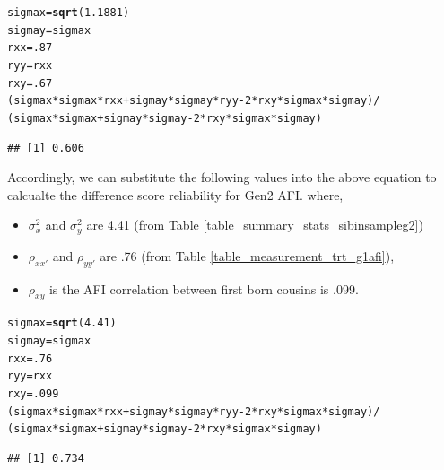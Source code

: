 \documentclass[a4paper,man,apacite,natbib,12pt]{apa6}\usepackage[]{graphicx}\usepackage[]{color}
\makeatletter
\newcommand{\hlnum}[1]{\textcolor[rgb]{0.686,0.059,0.569}{#1}}%
\newcommand{\hlopt}[1]{\textcolor[rgb]{0,0,0}{#1}}%
\newcommand{\hlstd}[1]{\textcolor[rgb]{0.345,0.345,0.345}{#1}}%
\newcommand{\hlkwb}[1]{\textcolor[rgb]{0.69,0.353,0.396}{#1}}%
\newcommand{\hlkwd}[1]{\textcolor[rgb]{0.737,0.353,0.396}{\textbf{#1}}}%
\newenvironment{kframe}{%
 \def\at@end@of@kframe{}%
 \ifinner\ifhmode%
  \def\at@end@of@kframe{\end{minipage}}%
  \begin{minipage}{\columnwidth}%
 \fi\fi%
 \def\FrameCommand##1{\hskip\@totalleftmargin \hskip-\fboxsep
 \colorbox{shadecolor}{##1}\hskip-\fboxsep
     \hskip-\linewidth \hskip-\@totalleftmargin \hskip\columnwidth}%
 \MakeFramed {\advance\hsize-\width
   \@totalleftmargin\z@ \linewidth\hsize
   \@setminipage}}%
 {\par\unskip\endMakeFramed%
 \at@end@of@kframe}
\newenvironment{knitrout}{}{} %
\newlength{\wideitemsep}
\let\olditem\item
\renewcommand{\item}{\setlength{\itemsep}{\wideitemsep}\olditem}
\makeatother
\begin{document}

\begin{knitrout}\footnotesize
{}\color{fgcolor}\begin{kframe}
\begin{alltt}
\hlstd{sigmax} \hlkwb{=} \hlkwd{sqrt}\hlstd{(}\hlnum{1.1881}\hlstd{)}
\hlstd{sigmay} \hlkwb{=} \hlstd{sigmax}
\hlstd{rxx} \hlkwb{=} \hlnum{.87}
\hlstd{ryy} \hlkwb{=} \hlstd{rxx}
\hlstd{rxy}\hlkwb{=}\hlnum{.67}
\hlstd{(sigmax}\hlopt{*}\hlstd{sigmax}\hlopt{*}\hlstd{rxx} \hlopt{+}\hlstd{sigmay}\hlopt{*}\hlstd{sigmay}\hlopt{*}\hlstd{ryy} \hlopt{-}\hlnum{2}\hlopt{*}\hlstd{rxy}\hlopt{*}\hlstd{sigmax}\hlopt{*}\hlstd{sigmay)} \hlopt{/}
  \hlstd{(sigmax}\hlopt{*}\hlstd{sigmax} \hlopt{+} \hlstd{sigmay}\hlopt{*}\hlstd{sigmay} \hlopt{-}\hlnum{2}\hlopt{*}\hlstd{rxy}\hlopt{*}\hlstd{sigmax}\hlopt{*}\hlstd{sigmay)}
\end{alltt}
\begin{verbatim}
## [1] 0.606
\end{verbatim}
\end{kframe}
\end{knitrout}
Accordingly, we can substitute the following values into the above equation to calcualte the difference score reliability for Gen2 AFI.
where, \begin{itemize}
\item $\sigma_{x}^{2}$ and $\sigma_{y}^{2}$  are 4.41 (from Table \vref{table_summary_stats_sibinsampleg2}) %
\item $\rho_{xx'}$ and $\rho_{yy'}$ are .76 (from Table \vref{table_measurement_trt_g1afi}), 
\item $\rho_{xy}$ is the AFI correlation between first born cousins is .099.\end{itemize}
\begin{knitrout}\footnotesize
{}\color{fgcolor}\begin{kframe}
\begin{alltt}
\hlstd{sigmax} \hlkwb{=} \hlkwd{sqrt}\hlstd{(}\hlnum{4.41}\hlstd{)}
\hlstd{sigmay} \hlkwb{=} \hlstd{sigmax}
\hlstd{rxx} \hlkwb{=} \hlnum{.76}
\hlstd{ryy} \hlkwb{=} \hlstd{rxx}
\hlstd{rxy}\hlkwb{=}\hlnum{.099}
\hlstd{(sigmax}\hlopt{*}\hlstd{sigmax}\hlopt{*}\hlstd{rxx} \hlopt{+}\hlstd{sigmay}\hlopt{*}\hlstd{sigmay}\hlopt{*}\hlstd{ryy} \hlopt{-}\hlnum{2}\hlopt{*}\hlstd{rxy}\hlopt{*}\hlstd{sigmax}\hlopt{*}\hlstd{sigmay)} \hlopt{/}
  \hlstd{(sigmax}\hlopt{*}\hlstd{sigmax} \hlopt{+} \hlstd{sigmay}\hlopt{*}\hlstd{sigmay} \hlopt{-}\hlnum{2}\hlopt{*}\hlstd{rxy}\hlopt{*}\hlstd{sigmax}\hlopt{*}\hlstd{sigmay)}
\end{alltt}
\begin{verbatim}
## [1] 0.734
\end{verbatim}
\end{kframe}
\end{knitrout}

\end{document}

